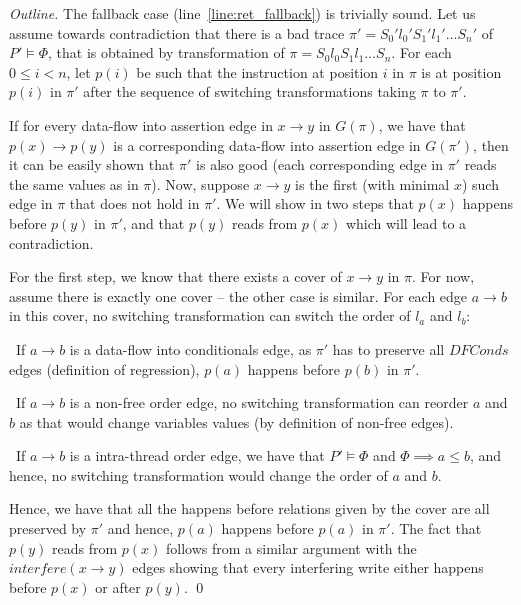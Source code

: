 \documentclass{llncs}
\newcommand\Prog{\ensuremath{\mathit{P}}}
\newcommand\ProgCons{\ensuremath{\Phi}}
\newcommand\ProgState{\ensuremath{S}}
\newcommand\trace{\pi}
\newcommand{\bluen}{\mathit{DFConds}}
\newcommand{\interfere}{\mathit{interfere}}
\begin{document}
\begin{proof}[Outline]
The fallback case (line~\ref{line:ret_fallback}) is trivially sound.
  Let us assume towards contradiction that there is a bad trace
  $\trace' = \ProgState_0'l_0'\ProgState_1'l_1'\ldots\ProgState_n'$ of
  $\Prog' \models \ProgCons$, that is obtained by transformation of 
  $\trace = \ProgState_0l_0\ProgState_1l_1\ldots\ProgState_n$.
  For each $0 \leq i < n$, let $p(i)$ be such that the instruction at
  position $i$ in $\trace$ is at position $p(i)$ in $\trace'$ after the
  sequence of switching transformations taking $\trace$ to $\trace'$.

  If for every data-flow into assertion edge in $x \to y$ in
  $G(\trace)$, we have that $p(x) \to p(y)$ is a corresponding data-flow
  into assertion edge in $G(\trace')$, then it can be easily shown that
  $\trace'$ is also good (each corresponding edge in $\trace'$ reads the
  same values as in $\trace$).
  Now, suppose $x \to y$ is the first (with minimal $x$) such edge in
  $\trace$ that does not hold in $\trace'$.
  We will show in two steps that $p(x)$ happens before $p(y)$ in $\trace'$,
  and that $p(y)$ reads from $p(x)$ which will lead to a contradiction.

  For the first step, we know that there exists a cover of $x \to y$
  in $\trace$.
  For now, assume there is exactly one cover -- the other case is
  similar.
  For each edge $a \to b$ in this cover, no switching transformation
  can switch the order of $l_a$ and $l_b$:
  \begin{compactitem}
  \item~If $a \to b$ is a data-flow into conditionals edge,
    as $\trace'$ has to preserve all $\bluen$ edges (definition of
    regression), 
    $p(a)$ happens before $p(b)$ in $\trace'$.
  \item~If $a \to b$ is a non-free order edge, no switching
    transformation can reorder $a$ and $b$ as that would change
    variables values (by definition of non-free edges).
  \item~If $a \to b$ is a intra-thread order edge, we have that $\Prog'
    \models \ProgCons$ and $\ProgCons \implies a \leq b$, and hence, no
    switching transformation would change the order of $a$ and $b$.
  \end{compactitem}
  Hence, we have that all the happens before relations given by the
  cover are all preserved by $\trace'$ and hence, $p(a)$ happens before
  $p(a)$ in $\trace'$.
The fact that $p(y)$ reads from $p(x)$ follows from a similar
  argument with the $\interfere(x \to y)$ edges
  showing that every interfering write either happens before $p(x)$ or
  after $p(y)$. 
\qed
\end{proof}
\end{document}
